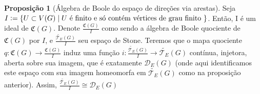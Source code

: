 \documentclass[11pt]{article}
\newcommand{\defeq}{\vcentcolon=}
\theoremstyle{definition}
\theoremstyle{definition}
\theoremstyle{definition}
\newtheorem{prop}{Proposição}
\newenvironment{proposicao}{
\definecolor{shadecolor}{HTML}{FFDBDF}
\begin{shaded}
\begin{prop}
}
{
\end{prop}
\end{shaded}
}
\theoremstyle{definition}
\theoremstyle{definition}
\theoremstyle{definition}
\theoremstyle{definition}
\theoremstyle{definition}
\theoremstyle{definition}
\theoremstyle{definition}
\theoremstyle{definition}
\theoremstyle{definition}
\begin{document}
\begin{proposicao}[Álgebra de Boole do espaço de direções via arestas]
    Seja $I \defeq \{U \subset V(G) \mid U \text{ é finito e só contém vértices de grau finito }\}$. Então, I é um ideal de $\mathfrak{C}(G)$. Denote $\frac{\mathfrak{C}(G)}{I}$ como sendo a álgebra de Boole quociente de $\mathfrak{C}(G)$ por $I$, e $\frac{\widetilde{\mathcal{T}_E}(G)}{I}$ seu espaço de Stone. Teremos que o mapa quociente $q: \mathfrak{C}(G) \rightarrow \frac{\mathfrak{C}(G)}{I}$ induz uma função $i: \frac{\widetilde{\mathcal{T}_E}(G)}{I} \rightarrow \widetilde{\mathcal{T}_E}(G)$  contínua, injetora, aberta sobre sua imagem, que é exatamente $\mathcal{D}_E(G)$ (onde aqui identificamos este espaço com sua imagem homeomorfa em $\widetilde{\mathcal{T}_E}(G)$ como na proposição anterior). Assim, $\frac{\widetilde{\mathcal{T}_E}(G)}{I} \cong \mathcal{D}_E(G) $
\end{proposicao}
\end{document}
